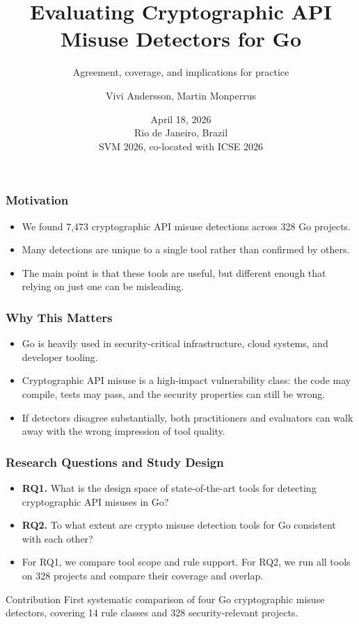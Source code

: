 \documentclass[10pt]{beamer}
\title[Crypto Misuse Detectors for Go]{\textbf{\LARGE Evaluating Cryptographic API Misuse Detectors for Go}}
\subtitle{Agreement, coverage, and implications for practice}
\author[Andersson and Monperrus]{Vivi Andersson, Martin Monperrus}
\institute[KTH]{KTH Royal Institute of Technology, Stockholm, Sweden}
\date[18 Apr 2026]{April 18, 2026\\Rio de Janeiro, Brazil\\SVM 2026, co-located with ICSE 2026}
\begin{document}
\frame{\titlepage}

\begin{frame}
    \frametitle{Motivation}
    \begin{itemize}
        \setlength{\itemsep}{0.7em}
        \item We found 7,473 cryptographic API misuse detections across 328 Go projects.
        \item Many detections are unique to a single tool rather than confirmed by others.
        \item The main point is that these tools are useful, but different enough that relying on just one can be misleading.
    \end{itemize}
\end{frame}

\begin{frame}
    \frametitle{Why This Matters}
    \begin{itemize}
        \setlength{\itemsep}{0.7em}
        \item Go is heavily used in security-critical infrastructure, cloud systems, and developer tooling.
        \item Cryptographic API misuse is a high-impact vulnerability class: the code may compile, tests may pass, and the security properties can still be wrong.
        \item If detectors disagree substantially, both practitioners and evaluators can walk away with the wrong impression of tool quality.
    \end{itemize}
\end{frame}

\begin{frame}
    \frametitle{Research Questions and Study Design}
    \begin{itemize}
        \setlength{\itemsep}{0.55em}
        \item \textbf{RQ1.} What is the design space of state-of-the-art tools for detecting cryptographic API misuses in Go?
        \item \textbf{RQ2.} To what extent are crypto misuse detection tools for Go consistent with each other?
        \item For RQ1, we compare tool scope and rule support. For RQ2, we run all tools on 328 projects and compare their coverage and overlap.
    \end{itemize}
    \vspace{0.6em}
    \begin{block}{Contribution}
        First systematic comparison of four Go cryptographic misuse detectors, covering 14 rule classes and 328 security-relevant projects.
    \end{block}
\end{frame}
\end{document}
